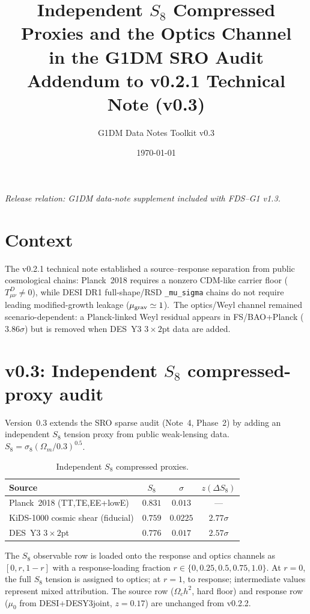 \documentclass[11pt]{article}
\title{Independent $S_8$ Compressed Proxies and the Optics Channel\\
in the G1DM SRO Audit\\
\large Addendum to v0.2.1 Technical Note (v0.3)}
\author{G1DM Data Notes Toolkit v0.3}
\date{\today}
\begin{document}
\maketitle

\noindent\textit{Release relation: G1DM data-note supplement included with FDS--G1 v1.3.}

\section{Context}

The v0.2.1 technical note established a source--response separation from
public cosmological chains: Planck~2018 requires a nonzero CDM-like carrier
floor ($T_{\mu\nu}^{D}\neq0$), while DESI DR1 full-shape/RSD
\texttt{\_mu\_sigma} chains do not require leading modified-growth leakage
($\mu_{\rm grav}\simeq1$).\  The optics/Weyl channel remained scenario-dependent:
a Planck-linked Weyl residual appears in FS/BAO+Planck ($3.86\sigma$) but is
removed when DES~Y3 $3\times2$pt data are added.

\section{v0.3: Independent $S_8$ compressed-proxy audit}

Version~0.3 extends the SRO sparse audit (Note~4, Phase~2) by adding an
independent $S_8$ tension proxy from public weak-lensing data.
$S_8 = \sigma_8(\Omega_m/0.3)^{0.5}$.

\begin{table}[h]
\centering
\caption{Independent $S_8$ compressed proxies.}\label{tab:s8values}
\begin{tabular}{lccc}
\toprule
Source & $S_8$ & $\sigma$ & $z(\Delta S_8)$ \\
\midrule
Planck~2018 (TT,TE,EE+lowE) & $0.831$ & $0.013$ & --- \\
KiDS-1000 cosmic shear (fiducial) & $0.759$ & $0.0225$ & $2.77\sigma$ \\
DES~Y3 $3\times2$pt & $0.776$ & $0.017$ & $2.57\sigma$ \\
\bottomrule
\end{tabular}
\end{table}

The $S_8$ observable row is loaded onto the response and optics channels as
$[0, r, 1-r]$ with a response-loading fraction
$r \in \{0, 0.25, 0.5, 0.75, 1.0\}$.  At $r=0$, the full $S_8$ tension is
assigned to optics; at $r=1$, to response; intermediate values represent
mixed attribution.  The source row ($\Omega_c h^2$, hard floor) and response row
($\mu_0$ from DESI+DESY3joint, $z=0.17$) are unchanged from v0.2.2.
\end{document}
